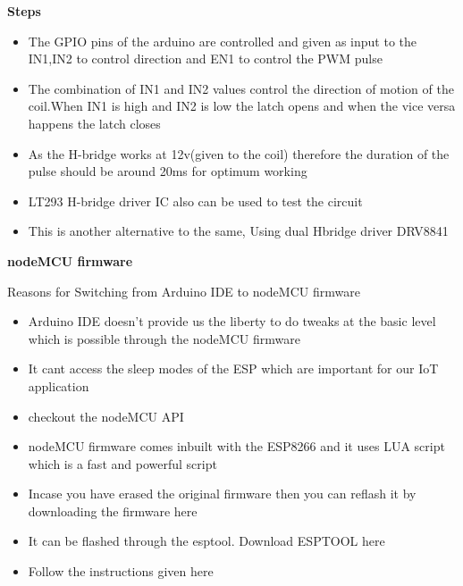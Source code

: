 \documentclass[16pt]{article}
\begin{document}
\begin{enumerate}
\textbf{Steps}

\begin{itemize}

\item
  The GPIO pins of the arduino are controlled and given as input to the
  IN1,IN2 to control direction and EN1 to control the PWM pulse
\item
  The combination of IN1 and IN2 values control the direction of motion
  of the coil.When IN1 is high and IN2 is low the latch opens and when
  the vice versa happens the latch closes
\item
  As the H-bridge works at 12v(given to the coil) therefore the duration
  of the pulse should be around 20ms for optimum working
\item
  LT293 H-bridge driver IC also can be used to test the
  circuit%
\item
  This is another alternative to the same, Using dual Hbridge driver
  DRV8841
\end{itemize}

\end{enumerate}

\vspace{19cm}
{\LARGE{\textbf{nodeMCU firmware}}}
\vspace{0.5cm}

Reasons for Switching from Arduino IDE to nodeMCU firmware

\begin{itemize}

\item
  Arduino IDE doesn't provide us the liberty to do tweaks at the basic
  level which is possible through the nodeMCU firmware
\item
  It cant access the sleep modes of the ESP which are important for our
  IoT application
\item
  checkout the nodeMCU API
\item
  nodeMCU firmware comes inbuilt with the ESP8266 and it uses LUA script
  which is a fast and powerful script
\item
  Incase you have erased the original firmware then you can reflash it
  by downloading the firmware here
\item
  It can be flashed through the esptool. Download ESPTOOL here
\item
  Follow the instructions given here
 
\end{itemize}
\end{document}
